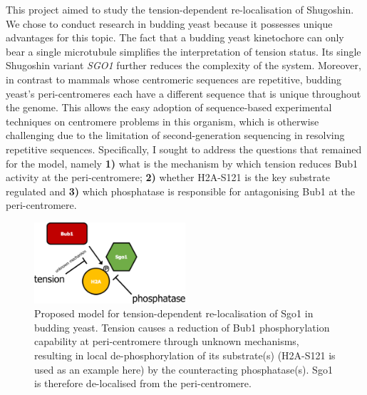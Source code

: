 This project aimed to study the tension-dependent re-localisation of Shugoshin. We chose to conduct research in budding yeast because it possesses unique advantages for this topic. The fact that a budding yeast kinetochore can only bear a single microtubule simplifies the interpretation of tension status. Its single Shugoshin variant \textit{SGO1} further reduces the complexity of the system. Moreover, in contrast to mammals whose centromeric sequences are repetitive, budding yeast's peri-centromeres each have a different sequence that is unique throughout the genome. This allows the easy adoption of sequence-based experimental techniques on centromere problems in this organism, which is otherwise challenging due to the limitation of second-generation sequencing in resolving repetitive sequences. Specifically, I sought to address the questions that remained for the \cite{Nerusheva2014} model, namely \textbf{1)} what is the mechanism by which tension reduces Bub1 activity at the peri-centromere; \textbf{2)} whether H2A-S121 is the key substrate regulated and \textbf{3)} which phosphatase is responsible for antagonising Bub1 at the peri-centromere. 








\begin{figure}[htbp]
  \centering
  \includegraphics[width=0.5\textwidth]{figures/naive model.pdf}
  \caption[Proposed model for tension-dependent re-localisation of Sgo1 in  budding yeast]{Proposed model for tension-dependent re-localisation of Sgo1 in  budding yeast. Tension causes a reduction of Bub1 phosphorylation capability at peri-centromere through unknown mechanisms, resulting in local de-phosphorylation of its substrate(s) (H2A-S121 is used as an example here) by the counteracting phosphatase(s). Sgo1 is therefore de-localised from the peri-centromere.}
  \label{fig:naive}
\end{figure} 

